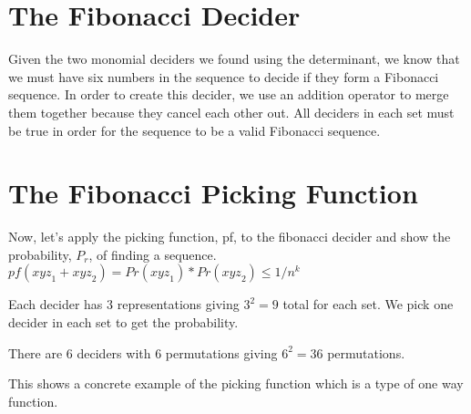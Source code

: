 \section{The Fibonacci Decider}

Given the two monomial deciders we found using the determinant, we know that we must have six numbers in the sequence to decide if they form a Fibonacci sequence. In order to create this decider, we use an addition operator to merge them together because they cancel each other out. All deciders in each set must be true in order for the sequence to be a valid Fibonacci sequence.

\section{The Fibonacci Picking Function}

Now, let's apply the picking function, pf, to the fibonacci decider and show the probability, $P_r$, of finding a sequence. $pf({xyz}_1 + {xyz}_2) = Pr({xyz}_1)*Pr({xyz}_2) \leq 1/n^{k}$

Each decider has 3 representations giving $3^2 = 9$ total for each set. We pick one decider in each set to get the probability.

There are 6 deciders with 6 permutations giving $6^2 = 36$ permutations.

This shows a concrete example of the picking function which is a type of one way function.
